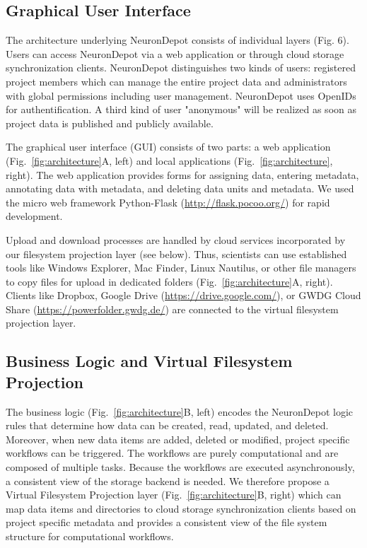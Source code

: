 \documentclass{frontiersSCNS} %
\begin{document}
\subsection{Graphical User Interface}
The architecture underlying NeuronDepot consists of individual layers (Fig. 6).
Users can access NeuronDepot via a web application or through cloud storage
synchronization clients. NeuronDepot distinguishes two kinds of users:
registered project members which can manage the entire project data and
administrators with global permissions including user management. NeuronDepot
uses OpenIDs for authentification. A third kind of user "anonymous" will be
realized as soon as project data is published and publicly available.

The graphical user interface (GUI) consists of two parts: a web application
(Fig.~\ref{fig:architecture}A, left) and local applications
(Fig.~\ref{fig:architecture}, right). The web application provides forms for
assigning data, entering metadata, annotating data with metadata, and deleting
data units and metadata. We used the micro web framework Python-Flask
(\url{http://flask.pocoo.org/}) for rapid development.

Upload and download processes are handled by cloud services incorporated by
our filesystem projection layer (see below). Thus, scientists can use
established tools like Windows Explorer, Mac Finder, Linux Nautilus, or other
file managers to copy files for upload in dedicated folders
(Fig.~\ref{fig:architecture}A, right).  Clients like Dropbox, Google Drive
(\url{https://drive.google.com/}), or GWDG Cloud Share
(\url{https://powerfolder.gwdg.de/}) are connected to the virtual filesystem
projection layer. 


\subsection{Business Logic and Virtual Filesystem Projection}\label{sec:projection_layer}

The business logic (Fig.~\ref{fig:architecture}B, left) encodes the NeuronDepot
logic rules that determine how data can be created, read, updated, and deleted.
Moreover, when new data items are added, deleted or modified, project specific
workflows can be triggered. The workflows are purely computational and are
composed of multiple tasks. Because the workflows are executed asynchronously,
a consistent view of the storage backend is needed. We therefore propose a
Virtual Filesystem Projection layer (Fig.~\ref{fig:architecture}B, right) which
can map data items and directories to cloud storage synchronization clients
based on project specific metadata and provides a consistent view of the file
system structure for computational workflows.
\end{document}
